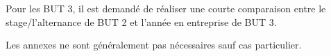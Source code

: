 \documentclass[12pt,oneside,noprintercorrection]{iut}
\begin{document}
\begin{aide}{}{}
Pour les BUT 3, il est demandé de réaliser une courte comparaison entre le stage/l'alternance de BUT 2 et l'année en entreprise de BUT 3.
\end{aide}


\small



\begin{aide}{}{}
  Les annexes ne sont généralement pas nécessaires sauf cas particulier.
\end{aide}
\end{document}
